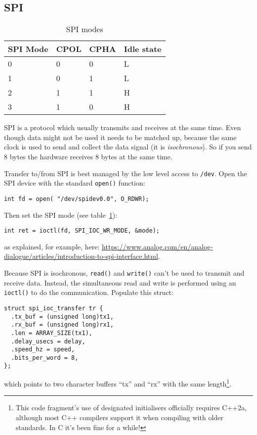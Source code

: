 \documentclass[12pt]{report}
\begin{document}
\subsection{SPI}
\begin{table}[!ht]
  \begin{center}
  \caption{SPI modes\label{spimodes}}
  \begin{tabular}{l|l|l|l}
    SPI Mode & 	CPOL & 	CPHA & Idle state \\
    \hline
    0& 	0&	0& 	L \\
    1& 	0&	1& 	L \\
    2& 	1&	1& 	H \\
    3& 	1&	0& 	H \\
  \end{tabular}
  \end{center}
\end{table}
SPI is a protocol which usually transmits and receives at the same
time. Even though data might not be used it needs to be matched up,
because the same clock is used to send and collect the data signal
(it is \emph{isochronous}).
So if you send 8 bytes the hardware receives 8 bytes at the same time.

Transfer to/from SPI is best managed by the low level access to \texttt{/dev}.
Open the SPI device with the standard \texttt{open()} function:
\begin{verbatim}
int fd = open( "/dev/spidev0.0", O_RDWR);
\end{verbatim}

Then set the SPI mode (see table~\ref{spimodes}):
\begin{verbatim}
int ret = ioctl(fd, SPI_IOC_WR_MODE, &mode);
\end{verbatim}
as explained, for example, here:
\url{https://www.analog.com/en/analog-dialogue/articles/introduction-to-spi-interface.html}.

Because SPI is isochronous, \texttt{read()} and \texttt{write()}
can't be used to transmit and receive data. Instead, the simultaneous
read and write is performed using an \texttt{ioctl()} to do the communication.
Populate this struct:
\begin{verbatim}
struct spi_ioc_transfer tr {
  .tx_buf = (unsigned long)tx1,
  .rx_buf = (unsigned long)rx1,
  .len = ARRAY_SIZE(tx1),
  .delay_usecs = delay,
  .speed_hz = speed,
  .bits_per_word = 8,
};
\end{verbatim}
which points to two character buffers ``tx'' and ``rx'' with the
same length\footnote{This code fragment's use of designated initialisers
officially requires C++2a, although most C++ compilers support it
when compiling with older standards. In C it's been fine for a while!}.
\end{document}
